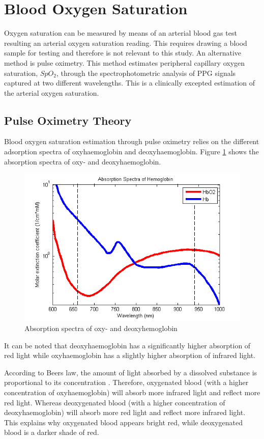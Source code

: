 \section{Blood Oxygen Saturation}
Oxygen saturation can be measured by means of an arterial blood gas test resulting an arterial oxygen saturation reading. This requires drawing a blood sample for testing and therefore is not relevant to this study. An alternative method is pulse oximetry. This method estimates peripheral capillary oxygen saturation, $SpO_2$, through the spectrophotometric analysis of PPG signals captured at two different wavelengths. This is a clinically excepted estimation of the arterial oxygen saturation.

\subsection{Pulse Oximetry Theory}
Blood oxygen saturation estimation through pulse oximetry relies on the different adsorption spectra of oxyhaemoglobin and deoxyhaemoglobin. Figure \ref{fig:AbsorptionSpectra} shows the absorption spectra of oxy- and deoxyhaemoglobin. 

\medskip
\begin{figure}
   \centering
   \includegraphics[scale=0.8]{figs/AbsorptionSpectra_Edit}
   \caption{Absorption spectra of oxy- and deoxyhemoglobin}
   \label{fig:AbsorptionSpectra}
\end{figure}

It can be noted that deoxyhaemoglobin has a significantly higher absorption of red light while oxyhaemoglobin has a slightly higher absorption of infrared light.

\medskip
According to Beers law, the amount of light absorbed by a dissolved substance is proportional to its concentration \citep{lambertANDbeer}. Therefore, oxygenated blood (with a higher concentration of oxyhaemoglobin) will absorb more infrared light and reflect more red light. Whereas deoxygenated blood (with a higher concentration of deoxyhaemoglobin) will absorb more red light and reflect more infrared light. This explains why oxygenated blood appears bright red, while deoxygenated blood is a darker shade of red.

